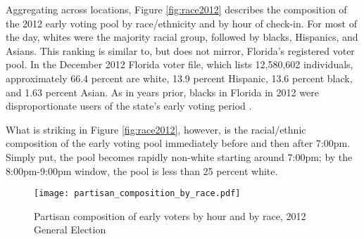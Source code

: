 \documentclass[12pt,titlepage]{article}
\begin{document}
Aggregating across locations, Figure \ref{fig:race2012} describes the
composition of the 2012 early voting pool by race/ethnicity and by
hour of check-in.  For most of the day, whites were the majority
racial group, followed by blacks, Hispanics, and Asians.  This ranking
is similar to, but does not mirror, Florida's registered voter pool.
In the December 2012 Florida voter file, which lists 12,580,602
individuals, approximately 66.4 percent are white, 13.9 percent
Hispanic, 13.6 percent black, and 1.63 percent Asian.  As in years
prior, blacks in Florida in 2012 were disproportionate users of the
state's early voting period \citep{herronsmith:souls}.





What is striking in Figure \ref{fig:race2012}, however, is the
racial/ethnic composition of the early voting pool immediately before
and then after 7:00pm.  Simply put, the pool becomes rapidly non-white
starting around 7:00pm; by the 8:00pm-9:00pm window, the pool is less
than 25 percent white.

\begin{figure}[!ht]
\caption{Partisan composition of early voters by hour and by race, 2012
  General Election}
  \label{fig:party2012}
  \centering
    \centering\texttt{[image: partisan\_composition\_by\_race.pdf]}
\end{figure}
\end{document}
